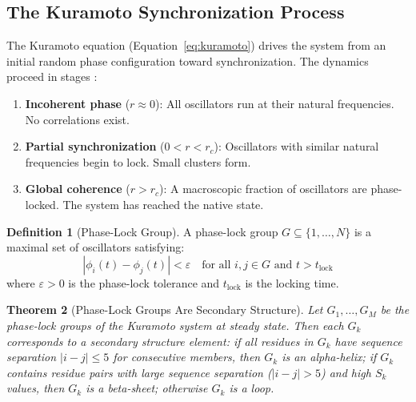 \documentclass[11pt,twocolumn,a4paper]{article}
\newtheorem{theorem}{Theorem}[section]
\theoremstyle{definition}
\newtheorem{definition}[theorem]{Definition}
\theoremstyle{remark}
\newcommand{\Sk}{S_k}
\newcommand{\orderpar}{r}
\newcommand{\phaselk}{\varepsilon}
\begin{document}
\subsection{The Kuramoto Synchronization Process}

The Kuramoto equation (Equation~\ref{eq:kuramoto}) drives the system from an initial random phase configuration toward synchronization. The dynamics proceed in stages \citep{strogatz2000, acebron2005}:

\begin{enumerate}
    \item \textbf{Incoherent phase} ($\orderpar \approx 0$): All oscillators run at their natural frequencies. No correlations exist.
    \item \textbf{Partial synchronization} ($0 < \orderpar < \orderpar_c$): Oscillators with similar natural frequencies begin to lock. Small clusters form.
    \item \textbf{Global coherence} ($\orderpar > \orderpar_c$): A macroscopic fraction of oscillators are phase-locked. The system has reached the native state.
\end{enumerate}

\begin{definition}[Phase-Lock Group]
\label{def:phase_lock_group}
A phase-lock group $G \subseteq \{1, \ldots, N\}$ is a maximal set of oscillators satisfying:
\begin{equation}
|\phi_i(t) - \phi_j(t)| < \phaselk \quad \text{for all } i, j \in G \text{ and } t > t_{\text{lock}}
\end{equation}
where $\phaselk > 0$ is the phase-lock tolerance and $t_{\text{lock}}$ is the locking time.
\end{definition}

\begin{theorem}[Phase-Lock Groups Are Secondary Structure]
\label{thm:phaselock_ss}
Let $G_1, \ldots, G_M$ be the phase-lock groups of the Kuramoto system at steady state. Then each $G_k$ corresponds to a secondary structure element: if all residues in $G_k$ have sequence separation $|i - j| \leq 5$ for consecutive members, then $G_k$ is an alpha-helix; if $G_k$ contains residue pairs with large sequence separation ($|i - j| > 5$) and high $\Sk$ values, then $G_k$ is a beta-sheet; otherwise $G_k$ is a loop.
\end{theorem}
\end{document}
